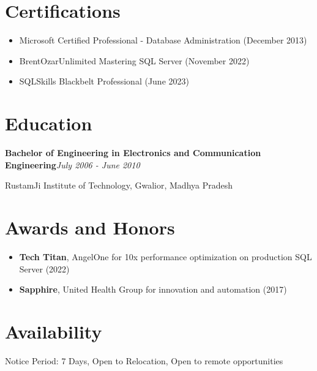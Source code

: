 \documentclass[10pt,a4paper]{article}
\begin{document}
\section{Certifications}
\begin{itemize}
  \item Microsoft Certified Professional - Database Administration (December 2013)
  \item BrentOzarUnlimited Mastering SQL Server (November 2022)
  \item SQLSkills Blackbelt Professional (June 2023)
\end{itemize}

\section{Education}
\noindent\textbf{Bachelor of Engineering in Electronics and Communication Engineering}\hfill \textit{July 2006 - June 2010}

RustamJi Institute of Technology, Gwalior, Madhya Pradesh

\section{Awards and Honors}
\begin{itemize}
  \item \textbf{Tech Titan}, AngelOne for 10x performance optimization on production SQL Server (2022)
  \item \textbf{Sapphire}, United Health Group for innovation and automation (2017)
\end{itemize}

\section{Availability}
Notice Period: 7 Days, Open to Relocation, Open to remote opportunities
\end{document}
